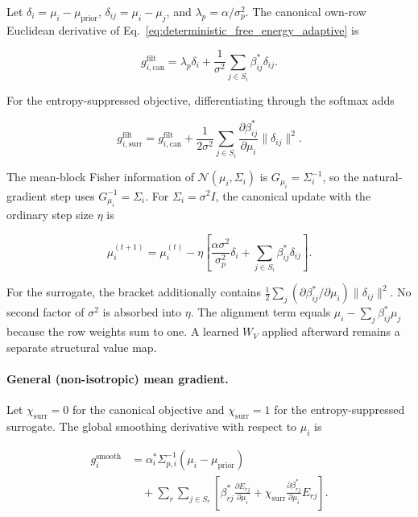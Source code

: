 \documentclass[twoside,11pt]{article}
\begin{document}
Let $\delta_i=\mu_i-\mu_{\mathrm{prior}}$, $\delta_{ij}=\mu_i-\mu_j$, and $\lambda_p=\alpha/\sigma_p^2$. The canonical own-row Euclidean derivative of Eq.~\eqref{eq:deterministic_free_energy_adaptive} is

\begin{equation}
g_{i,\mathrm{can}}^{\mathrm{filt}}
=\lambda_p\delta_i
+\frac{1}{\sigma^2}\sum_{j\in S_i}\beta_{ij}^*\delta_{ij}.
\label{eq:isotropic_canonical_gradient}
\end{equation}

For the entropy-suppressed objective, differentiating through the softmax adds

\begin{equation}
g_{i,\mathrm{surr}}^{\mathrm{filt}}
=g_{i,\mathrm{can}}^{\mathrm{filt}}
+\frac{1}{2\sigma^2}
\sum_{j\in S_i}
\frac{\partial\beta_{ij}^*}{\partial\mu_i}
\|\delta_{ij}\|^2.
\label{eq:isotropic_surrogate_gradient}
\end{equation}

The mean-block Fisher information of $\mathcal{N}(\mu_i,\Sigma_i)$ is $G_{\mu_i}=\Sigma_i^{-1}$, so the natural-gradient step uses $G_{\mu_i}^{-1}=\Sigma_i$. For $\Sigma_i=\sigma^2I$, the canonical update with the ordinary step size $\eta$ is

\begin{equation}
\boxed{
\mu_i^{(t+1)}
=\mu_i^{(t)}
-\eta\left[
\frac{\alpha\sigma^2}{\sigma_p^2}\delta_i
+\sum_{j\in S_i}\beta_{ij}^*\delta_{ij}
\right].
}
\label{eq:isotropic_natural_update}
\end{equation}

For the surrogate, the bracket additionally contains $\frac{1}{2}\sum_j(\partial\beta_{ij}^*/\partial\mu_i)\|\delta_{ij}\|^2$. No second factor of $\sigma^2$ is absorbed into $\eta$. The alignment term equals $\mu_i-\sum_j\beta_{ij}^*\mu_j$ because the row weights sum to one. A learned $W_V$ applied afterward remains a separate structural value map.

\paragraph{General (non-isotropic) mean gradient.}
Let $\chi_{\mathrm{surr}}=0$ for the canonical objective and $\chi_{\mathrm{surr}}=1$ for the entropy-suppressed surrogate. The global smoothing derivative with respect to $\mu_i$ is

\begin{equation}
\boxed{
\begin{aligned}
g_i^{\mathrm{smooth}}
&=\alpha_i^*\Sigma_{p,i}^{-1}
(\mu_i-\mu_{\mathrm{prior}})\\
&\quad+\sum_r\sum_{j\in S_r}
\left[
\beta_{rj}^*\frac{\partial E_{rj}}{\partial\mu_i}
+\chi_{\mathrm{surr}}
\frac{\partial\beta_{rj}^*}{\partial\mu_i}E_{rj}
\right].
\end{aligned}
}
\label{eq:mu_gradient_general}
\end{equation}
\end{document}
